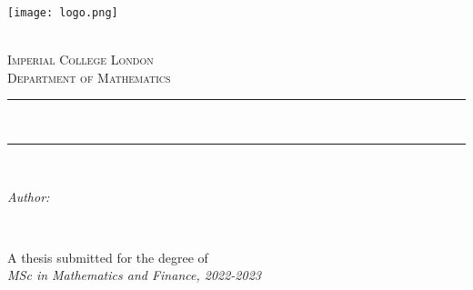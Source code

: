 \begin{titlepage}

\newcommand{\HRule}{\rule{\linewidth}{0.5mm}} 
\texttt{[image: logo.png]}\\[1cm]
\center

\quad\\[1.5cm]
\textsc{\Large Imperial College London}\\[0.5cm]
\textsc{\large Department of Mathematics}\\[0.5cm]

\makeatletter
\HRule \\[0.2cm]
\begin{spacing}{2.5}
{\huge \bfseries \@title}
\end{spacing}
\HRule \\[1.5cm]
 
\begin{minipage}{0.8\textwidth}
\begin{flushleft} \large
\emph{Author:}
\@author
\end{flushleft}
\end{minipage}
~\vspace{2cm}
\makeatother


{\large A thesis submitted for the degree of}\\[0.5cm]
{\large \emph{MSc in Mathematics and Finance, 2022-2023}}\\[0.5cm]

\vfill

\end{titlepage}